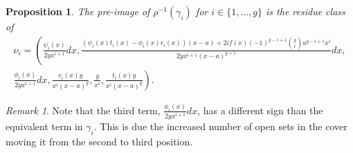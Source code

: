 \documentclass[draft, 11pt]{article} %
\theoremstyle{plain}
\newtheorem{prop}[defn]{Proposition}
\theoremstyle{remark}
\newtheorem*{rem}{Remark}
\begin{document}
\begin{prop}\label{basis22}
The pre-image of $\rho^{-1}(\gamma_i)$ for $i \in \{1, \ldots, g\}$ is the residue class of
\begin{multline*}
\nu_i = \left(\frac{\psi_i(x)}{2yx^{i+1}}dx, \frac{(\psi_i(x)t_i(x) - \phi_i(x)r_i(x))(x-a) + 2if(x)(-1)^{g-i+1}\binom{g}{i} a^{g-i+1}x^i}{2yx^{i+1}(x-a)^{g+1}}dx,\right. \\\left. \frac{\phi_i(x)}{2yx^{i+1}}dx,  \frac{r_i(x)y}{x^i(x-a)^g}, \frac{y}{x^i},  \frac{t_i(x)y}{x^i(x-a)^g} \right).
\end{multline*}
\end{prop}
\begin{rem}
Note that the third term, $\frac{\phi_i(x)}{2yx^{i+1}} dx$, has a different sign than the equivalent term in $\gamma_i$.
This is due the increased number of open sets in the cover moving it from the second to third position.
\end{rem}
\end{document}
